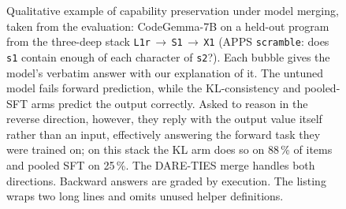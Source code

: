 \begin{figure}[t]
{}
\caption{Qualitative example of capability preservation under model merging, taken from the
evaluation: CodeGemma-7B on a held-out program from the three-deep stack
\texttt{L1r}\,$\rightarrow$\,\texttt{S1}\,$\rightarrow$\,\texttt{X1} (APPS \texttt{scramble}:
does \texttt{s1} contain enough of each character of \texttt{s2}?). Each bubble gives the
model's verbatim answer with our explanation of it. The untuned model fails forward prediction,
while the KL-consistency and pooled-SFT arms predict the output correctly. Asked to reason in
the reverse direction, however, they reply with the output value itself rather than an input,
effectively answering the forward task they were trained on; on this stack the KL arm does so on
88\,\% of items and pooled SFT on 25\,\%. The DARE-TIES merge handles both directions.
Backward answers are graded by execution. The listing wraps two long lines and omits unused
helper definitions.}
\label{fig:case-study}
\end{figure}

